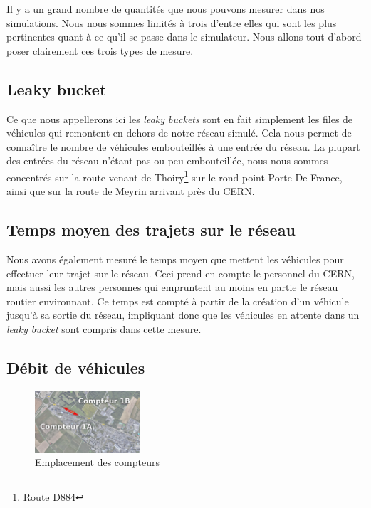 \documentclass[a4paper,11pt, titlepage]{extarticle}
\begin{document}
Il y a un grand nombre de quantités que nous pouvons mesurer dans nos simulations. Nous nous sommes limités à trois d'entre elles qui sont les plus pertinentes quant à ce qu'il se passe dans le simulateur. Nous allons tout d'abord poser clairement ces trois types de mesure.

\subsection{Leaky bucket}

Ce que nous appellerons ici les \emph{leaky buckets} sont en fait simplement les files de véhicules qui remontent en-dehors de notre réseau simulé. Cela nous permet de connaître le nombre de véhicules embouteillés à une entrée du réseau. La plupart des entrées du réseau n'étant pas ou peu embouteillée, nous nous sommes concentrés sur la route venant de Thoiry\footnote{Route D884} sur le rond-point Porte-De-France, ainsi que sur la route de Meyrin arrivant près du CERN.

\subsection{Temps moyen des trajets sur le réseau}

Nous avons également mesuré le temps moyen que mettent les véhicules pour effectuer leur trajet sur le réseau. Ceci prend en compte le personnel du CERN, mais aussi les autres personnes qui empruntent au moins en partie le réseau routier environnant. Ce temps est compté à partir de la création d'un véhicule jusqu'à sa sortie du réseau, impliquant donc que les véhicules en attente dans un \emph{leaky bucket} sont compris dans cette mesure.

\subsection{Débit de véhicules}

\begin{figure}
  \begin{center}
    \includegraphics[width=0.35\textwidth]{images/emplacementCompteurs.png}
  \end{center}
  \vspace{-0.8cm}
  \caption{Emplacement des compteurs}
  \label{imgCompteurs}
\end{figure}
\end{document}
